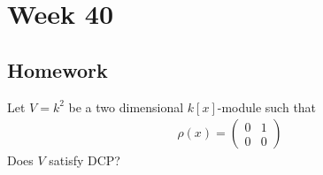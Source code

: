 \section{Week 40}

\subsection{Homework}

\begin{prop}
Let \(V=k^{2}\) be a two dimensional \(k[x]\)-module such that
\begin{align*}
\rho (x)=\begin{pmatrix}0& 1 \\ 0 & 0\end{pmatrix}
\end{align*}
Does \(V\) satisfy DCP?
\end{prop}


